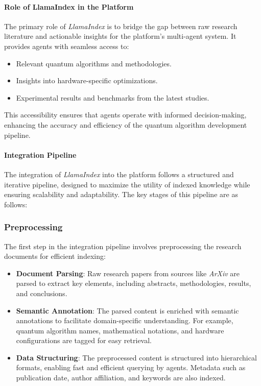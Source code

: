 \documentclass[12pt]{article}
\begin{document}
\paragraph{Role of LlamaIndex in the Platform}
The primary role of \textit{LlamaIndex} is to bridge the gap between raw research literature and actionable insights for the platform's multi-agent system. It provides agents with seamless access to:
\begin{itemize}
    \item Relevant quantum algorithms and methodologies.
    \item Insights into hardware-specific optimizations.
    \item Experimental results and benchmarks from the latest studies.
\end{itemize}
This accessibility ensures that agents operate with informed decision-making, enhancing the accuracy and efficiency of the quantum algorithm development pipeline.

\paragraph{Integration Pipeline}
The integration of \textit{LlamaIndex} into the platform follows a structured and iterative pipeline, designed to maximize the utility of indexed knowledge while ensuring scalability and adaptability. The key stages of this pipeline are as follows:

\subsubsection{Preprocessing}
The first step in the integration pipeline involves preprocessing the research documents for efficient indexing:
\begin{itemize}
    \item \textbf{Document Parsing}: Raw research papers from sources like \textit{ArXiv} are parsed to extract key elements, including abstracts, methodologies, results, and conclusions.
    \item \textbf{Semantic Annotation}: The parsed content is enriched with semantic annotations to facilitate domain-specific understanding. For example, quantum algorithm names, mathematical notations, and hardware configurations are tagged for easy retrieval.
    \item \textbf{Data Structuring}: The preprocessed content is structured into hierarchical formats, enabling fast and efficient querying by agents. Metadata such as publication date, author affiliation, and keywords are also indexed.
\end{itemize}
\end{document}
